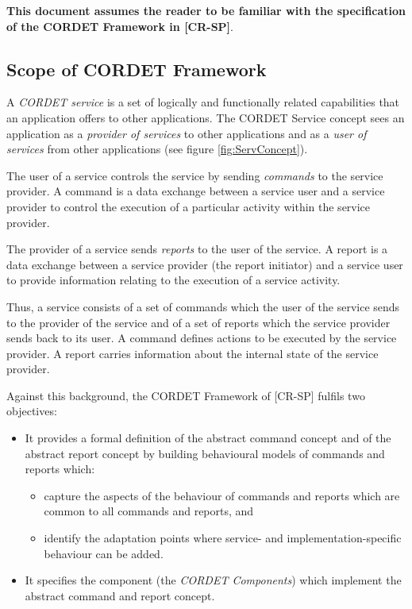\documentclass{pnp_article}
\begin{document}
\textbf{This document assumes the reader to be familiar with the specification of the CORDET Framework in [CR-SP]}. 

\subsection{Scope of CORDET Framework}\label{sec:ScopeCrFw}
A \textit{CORDET service} is a set of logically and functionally related capabilities that an application offers to other applications. The CORDET Service concept sees an application as a \textit{provider of services} to other applications and as a \textit{user of services} from other applications (see figure \ref{fig:ServConcept}).


The user of a service controls the service by sending \textit{commands} to the service provider. A command is a data exchange between a service user and a service provider to control the execution of a particular activity within the service provider. 

The provider of a service sends \textit{reports} to the user of the service. A report is a data exchange between a service provider (the report initiator) and a service user to provide information relating to the execution of a service activity.

Thus, a service consists of a set of commands which the user of the service sends to the provider of the service and of a set of reports which the service provider sends back to its user. A command defines actions to be executed by the service provider. A report carries information about the internal state of the service provider.

Against this background, the CORDET Framework of [CR-SP] fulfils two objectives:

\begin{itemize}
\item{} It provides a formal definition of the abstract command concept and of the abstract report concept by building behavioural models of commands and reports which:
	\begin{itemize}
	\item capture the aspects of the behaviour of commands and reports which are common to all commands and reports, and
	\item identify the adaptation points where service- and implementation-specific behaviour can be added.
	\end{itemize}
\item{} It specifies the component (the \textit{CORDET Components}) which implement the abstract command and report concept.
\end{itemize}
\end{document}
